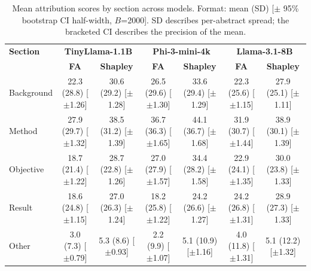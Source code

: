 \begin{table}[t]
\centering
\caption{Mean attribution scores by section across models. Format: mean (SD) [$\pm$ 95\% bootstrap CI half-width, $B$=2000]. SD describes per-abstract spread; the bracketed CI describes the precision of the mean.}
\label{tab:mean_attribution}
\small
\begin{tabular}{lcccccc}
\toprule
\textbf{Section} & \multicolumn{2}{c}{\textbf{TinyLlama-1.1B}} & \multicolumn{2}{c}{\textbf{Phi-3-mini-4k}} & \multicolumn{2}{c}{\textbf{Llama-3.1-8B}} \\
 & \textbf{FA} & \textbf{Shapley} & \textbf{FA} & \textbf{Shapley} & \textbf{FA} & \textbf{Shapley} \\
\midrule
Background & 22.3 (28.8) [$\pm$1.26] & 30.6 (29.2) [$\pm$1.28] & 26.5 (29.6) [$\pm$1.30] & 33.6 (29.4) [$\pm$1.29] & 22.3 (25.6) [$\pm$1.15] & 27.9 (25.1) [$\pm$1.11] \\
Method & 27.9 (29.7) [$\pm$1.32] & 38.5 (31.2) [$\pm$1.39] & 36.7 (36.3) [$\pm$1.65] & 44.1 (36.7) [$\pm$1.68] & 31.9 (30.7) [$\pm$1.44] & 38.9 (30.1) [$\pm$1.39] \\
Objective & 18.7 (21.4) [$\pm$1.22] & 28.7 (22.8) [$\pm$1.26] & 27.0 (27.9) [$\pm$1.57] & 34.4 (28.2) [$\pm$1.58] & 22.9 (24.1) [$\pm$1.35] & 30.0 (23.8) [$\pm$1.33] \\
Result & 18.6 (24.8) [$\pm$1.15] & 27.0 (26.3) [$\pm$1.24] & 18.2 (25.8) [$\pm$1.22] & 24.2 (26.6) [$\pm$1.27] & 24.2 (26.8) [$\pm$1.31] & 28.9 (27.3) [$\pm$1.33] \\
Other & 3.0 (7.3) [$\pm$0.79] & 5.3 (8.6) [$\pm$0.93] & 2.2 (9.9) [$\pm$1.07] & 5.1 (10.9) [$\pm$1.16] & 4.0 (11.8) [$\pm$1.31] & 5.1 (12.2) [$\pm$1.32] \\
\bottomrule
\end{tabular}
\end{table}